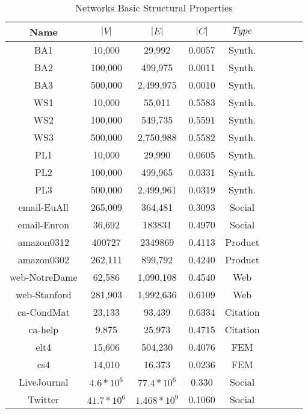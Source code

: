 \documentclass{acm_proc_article-sp}
\begin{document}
\begin{table}
\centering
\caption{Networks Basic Structural Properties}
\label{table:dataset}
\begin{tabular}{|c|c|c|c|c|c|c|c|c|}
\hline
\textbf{ Name} &   $|V|$   &   $|E|$   &   $|C|$   &   $Type$   \\
\hline
BA1                    & 10,000  & 29,992 & 0.0057   & Synth.  \\
\hline
BA2         	       & 100,000	 & 499,975 & 0.0011   & Synth. \\
\hline
BA3         	       & 500,000	 & 2,499,975 & 0.0010   & Synth.  \\
\hline
WS1                    & 10,000  & 55,011  & 0.5583   & Synth.  \\
\hline
WS2         	       & 100,000	 & 549,735 & 0.5591   & Synth.  \\
\hline
WS3         	       & 500,000	 & 2,750,988 & 0.5582   & Synth.  \\
\hline
PL1                    & 10,000  & 29,990 & 0.0605   & Synth.  \\
\hline
PL2         	       & 100,000	 & 499,965 & 0.0331   & Synth.  \\
\hline
PL3         	       & 500,000	 & 2,499,961 & 0.0319   & Synth.  \\
\hline
email-EuAll            & 265,009	 & 364,481  &0.3093   & Social   \\
\hline
email-Enron            & 36,692	 & 183831&0.4970 & Social  \\
\hline
amazon0312             &400727 	 &2349869  & 0.4113 & Product   \\
\hline
amazon0302             &262,111  & 899,792& 0.4240 & Product   \\
\hline
web-NotreDame          & 62,586	 & 1,090,108 & 0.4540 & Web   \\
\hline
web-Stanford           & 281,903	 & 1,992,636 & 0.6109 & Web  \\
\hline
ca-CondMat               & 23,133	 &  93,439 & 0.6334 & Citation  \\
\hline
ca-help              & 9,875	 & 25,973 & 0.4715 & Citation  \\
\hline
elt4               & 15,606	 & 504,230 & 0.4076 & FEM  \\
\hline
cs4               & 14,010	 & 16,373 & 0.0236 & FEM  \\
\hline
LiveJournal        & $4.6*10^{6}$	 & $77.4*10^{6}$ & 0.330 & Social  \\
\hline
Twitter        & $41.7*10^{6}$	 & $1.468*10^{9}$ & 0.1060 & Social  \\
\hline
\end{tabular}
\end{table}
\par
\end{document}
